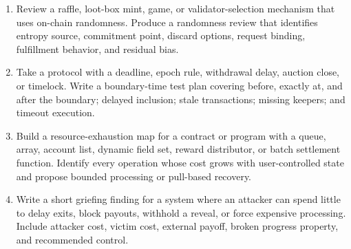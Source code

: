 \begin{enumerate}
\item Review a raffle, loot-box mint, game, or validator-selection mechanism that uses on-chain randomness. Produce a randomness review that identifies entropy source, commitment point, discard options, request binding, fulfillment behavior, and residual bias.

\item Take a protocol with a deadline, epoch rule, withdrawal delay, auction close, or timelock. Write a boundary-time test plan covering before, exactly at, and after the boundary; delayed inclusion; stale transactions; missing keepers; and timeout execution.

\item Build a resource-exhaustion map for a contract or program with a queue, array, account list, dynamic field set, reward distributor, or batch settlement function. Identify every operation whose cost grows with user-controlled state and propose bounded processing or pull-based recovery.

\item Write a short griefing finding for a system where an attacker can spend little to delay exits, block payouts, withhold a reveal, or force expensive processing. Include attacker cost, victim cost, external payoff, broken progress property, and recommended control.
\end{enumerate}
